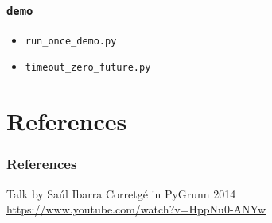 \documentclass[compress,usenames,dvipsnames]{beamer}
\begin{document}
\begin{frame}[plain]
    \frametitle{\lstinline{demo}}
    \begin{itemize}
        \item \lstinline{run_once_demo.py}
        \item \lstinline{timeout_zero_future.py}
    \end{itemize}

\end{frame}

\section{References}
\begin{frame}\frametitle{References}
    \begin{thebibliography}{9}
        Talk by Saúl Ibarra Corretgé in PyGrunn 2014
        \url{https://www.youtube.com/watch?v=HppNu0-ANYw} 
    \end{thebibliography}
\end{frame}
\end{document}
